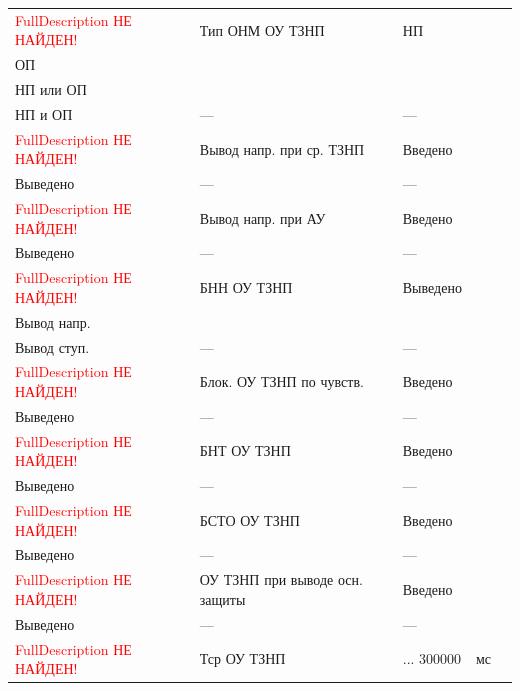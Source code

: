 \begin{longtable}{|>{\centering\arraybackslash}m{5.3cm}|>{\centering\arraybackslash}m{3.3cm}|>{\centering\arraybackslash}m{4.2cm}|>{\centering\arraybackslash}m{1.8cm}|>{\centering\arraybackslash}m{1cm}|}
\hline
\raggedright \textcolor{red}{FullDescription НЕ НАЙДЕН!} & \centering Тип ОНМ ОУ ТЗНП & \centering НП \\ ОП \\ НП или ОП \\ НП и ОП & \centering --- & \centering \arraybackslash --- \\
\hline
\raggedright \textcolor{red}{FullDescription НЕ НАЙДЕН!} & \centering Вывод напр. при ср. ТЗНП & \centering Введено \\ Выведено & \centering --- & \centering \arraybackslash --- \\
\hline
\raggedright \textcolor{red}{FullDescription НЕ НАЙДЕН!} & \centering Вывод напр. при АУ & \centering Введено \\ Выведено & \centering --- & \centering \arraybackslash --- \\
\hline
\raggedright \textcolor{red}{FullDescription НЕ НАЙДЕН!} & \centering БНН ОУ ТЗНП & \centering Выведено \\ Вывод напр. \\ Вывод ступ. & \centering --- & \centering \arraybackslash --- \\
\hline
\raggedright \textcolor{red}{FullDescription НЕ НАЙДЕН!} & \centering Блок. ОУ ТЗНП по чувств. & \centering Введено \\ Выведено & \centering --- & \centering \arraybackslash --- \\
\hline
\raggedright \textcolor{red}{FullDescription НЕ НАЙДЕН!} & \centering БНТ ОУ ТЗНП & \centering Введено \\ Выведено & \centering --- & \centering \arraybackslash --- \\
\hline
\raggedright \textcolor{red}{FullDescription НЕ НАЙДЕН!} & \centering БСТО ОУ ТЗНП & \centering Введено \\ Выведено & \centering --- & \centering \arraybackslash --- \\
\hline
\raggedright \textcolor{red}{FullDescription НЕ НАЙДЕН!} & \centering ОУ ТЗНП при выводе осн. защиты & \centering Введено \\ Выведено & \centering --- & \centering \arraybackslash --- \\
\hline
\raggedright \textcolor{red}{FullDescription НЕ НАЙДЕН!} & \centering Тср ОУ ТЗНП & \centering 0 ... 300000 & \centering мс & \centering \arraybackslash 5 \\
\hline
\end{longtable}
\normalsize




